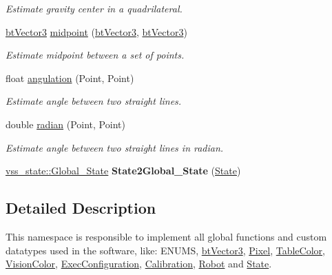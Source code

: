 \begin{DoxyCompactItemize}
\begin{DoxyCompactList}\small\item\em Estimate gravity center in a quadrilateral. \end{DoxyCompactList}\item 
\hyperlink{structcommon_1_1btVector3}{bt\+Vector3} \hyperlink{namespacecommon_a8018da38b6ea9b1dfa514730ad24ab2b}{midpoint} (\hyperlink{structcommon_1_1btVector3}{bt\+Vector3}, \hyperlink{structcommon_1_1btVector3}{bt\+Vector3})\hypertarget{namespacecommon_a8018da38b6ea9b1dfa514730ad24ab2b}{}\label{namespacecommon_a8018da38b6ea9b1dfa514730ad24ab2b}

\begin{DoxyCompactList}\small\item\em Estimate midpoint between a set of points. \end{DoxyCompactList}\item 
float \hyperlink{namespacecommon_a8c1ef8d4ce3fdb3e30af47c9c11bf04a}{angulation} (Point, Point)
\begin{DoxyCompactList}\small\item\em Estimate angle between two straight lines. \end{DoxyCompactList}\item 
double \hyperlink{namespacecommon_ac58a1918510dc4dbc7b65255593df38e}{radian} (Point, Point)\hypertarget{namespacecommon_ac58a1918510dc4dbc7b65255593df38e}{}\label{namespacecommon_ac58a1918510dc4dbc7b65255593df38e}

\begin{DoxyCompactList}\small\item\em Estimate angle between two straight lines in radian. \end{DoxyCompactList}\item 
\hyperlink{classvss__state_1_1Global__State}{vss\+\_\+state\+::\+Global\+\_\+\+State} {\bfseries State2\+Global\+\_\+\+State} (\hyperlink{structcommon_1_1State}{State})\hypertarget{namespacecommon_a1bbdd9ba2d86c2836628baceefa1a4df}{}\label{namespacecommon_a1bbdd9ba2d86c2836628baceefa1a4df}

\end{DoxyCompactItemize}


\subsection{Detailed Description}
This namespace is responsible to implement all global functions and custom datatypes used in the software, like\+: E\+N\+U\+MS, \hyperlink{structcommon_1_1btVector3}{bt\+Vector3}, \hyperlink{structcommon_1_1Pixel}{Pixel}, \hyperlink{structcommon_1_1TableColor}{Table\+Color}, \hyperlink{structcommon_1_1VisionColor}{Vision\+Color}, \hyperlink{structcommon_1_1ExecConfiguration}{Exec\+Configuration}, \hyperlink{structcommon_1_1Calibration}{Calibration}, \hyperlink{structcommon_1_1Robot}{Robot} and \hyperlink{structcommon_1_1State}{State}. 

